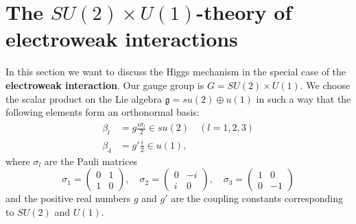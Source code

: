 \documentclass[11pt]{amsart}
\theoremstyle{definition}
\theoremstyle{remark}
\numberwithin{equation}{section}
\begin{document}
\section{The $SU(2)\times U(1)$-theory of electroweak interactions}\label{section electroweak}

In this section we want to discuss the Higgs mechanism in the special case of the {\bf electroweak interaction}. Our gauge group is $G=SU(2)\times U(1)$. We choose the scalar product on the Lie algebra $\mathfrak{g}=su(2)\oplus u(1)$ in such a way that the following elements form an orthonormal basis: 
\begin{align*}
\beta_l&=g\frac{i\sigma_l}{2}\in su(2)\quad(l=1,2,3)\\
\beta_4&=g'\frac{i}{2}\in u(1),
\end{align*}
where $\sigma_l$ are the Pauli matrices
\begin{equation*}
\sigma_1=\left(\begin{array}{cc}0&1\\1&0\end{array}\right),\quad\sigma_2=\left(\begin{array}{cc}0&-i\\i&0\end{array}\right),\quad\sigma_3=\left(\begin{array}{cc}1&0\\0&-1\end{array}\right)
\end{equation*} 
and the positive real numbers $g$ and $g'$ are the coupling constants corresponding to $SU(2)$ and $U(1)$. 
\end{document}
